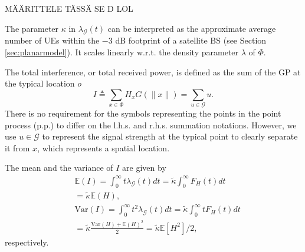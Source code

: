 \documentclass[lettersize,journal]{IEEEtran}
\begin{document}
 MÄÄRITTELE TÄSSÄ SE D LOL

The parameter $\kappa$ in $\lambda_{\mathcal{G}}(t)$ can be interpreted as the approximate average number of UEs within the $-3$ dB footprint of a satellite BS (see Section \ref{sec:planarmodel}). It scales linearly w.r.t. the density parameter $\lambda$ of $\Phi$.

The total interference, or total received power, is defined as the sum of the GP at the typical location $\textit{o}$ 
\begin{equation}
  \label{eq:totpow}
  I \triangleq \sum_{x \in \Phi} H_x G(\|x\|) = \sum_{u \in \mathcal{G}} u.
\end{equation}
There is no requirement for the symbols representing the points in the point process (p.p.) to differ on the l.h.s. and r.h.s. summation notations. However, we use $u \in \mathcal{G}$ to represent the signal strength at the typical point to clearly separate it from $x$, which represents a spatial location.




The mean and the variance of $I$ are given by
\begin{align}
  \label{eq:totmean}
  &\mathbb{E}\left(I \right) = \int_{0}^{\infty} t\lambda_{\mathcal{G}}(t) dt = \tilde{\kappa} \int_{0}^{\infty}F_H(t) dt \nonumber \\
  &=\tilde{\kappa} \mathbb{E}(H), \\\
  \label{eq:totvar}
  &\text{Var}\left(I \right) = \int_{0}^{\infty} t^2\lambda_{\mathcal{G}}(t) dt= \tilde{\kappa} \int_0^{\infty}tF_H(t) dt  \nonumber \\
  &= \tilde{\kappa} \frac{\text{Var}(H) + \mathbb{E}(H)^2}{2} = \tilde{\kappa}  \mathbb{E}[H^2]/2,
\end{align}
respectively.

\end{document}
